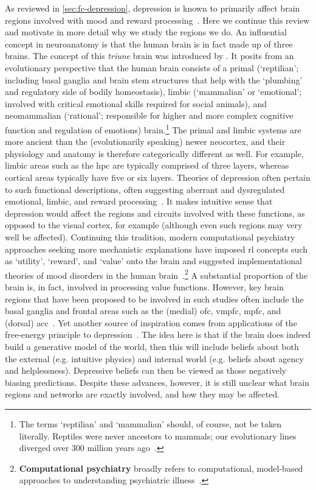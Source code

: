 As reviewed in \cref{sec:fc-depression}, depression is known to primarily affect brain regions involved with mood and reward processing~\parencite{Pandya2012}.
Here we continue this review and motivate in more detail why we study the regions we do.
%
An influential concept in neuroanatomy is that the human brain is in fact made up of three brains.
The concept of this \emph{triune} brain was introduced by \textcite{Maclean1985}.
It posits from an evolutionary perspective that the human brain consists of a primal (`reptilian'; including basal ganglia and brain stem structures that help with the `plumbing' and regulatory side of bodily homeostasis), limbic (`mammalian' or `emotional'; involved with critical emotional skills required for social animals), and neomammalian (`rational'; responsible for higher and more complex cognitive function and regulation of emotions) brain.\footnote{The terms `reptilian' and `mammalian' should, of course, not be taken literally. Reptiles were never ancestors to mammals; our evolutionary lines diverged over 300 million years ago~\parencite{Striedter2019}.}
The primal and limbic systems are more ancient than the (evolutionarily speaking) newer neocortex, and their physiology and anatomy is therefore categorically different as well.
For example, limbic areas such as the \gls{hpc} are typically comprised of three layers, whereas cortical areas typically have five or six layers.
Theories of depression often pertain to such functional descriptions, often suggesting aberrant and dysregulated emotional, limbic, and reward processing~\parencite{Akiskal1973}.
It makes intuitive sense that depression would affect the regions and circuits involved with these functions, as opposed to the visual cortex, for example (although even such regions may very well be affected).
Continuing this tradition, modern computational psychiatry approaches seeking more mechanistic explanations have imposed \gls{rl} concepts such as `utility', `reward', and `value' onto the brain and suggested implementational theories of mood disorders in the human brain~\parencite{Huys2013, Chen2015, Eldar2016, Juechems2019, Bennett2020, Bennett2021}.\footnote{\textbf{Computational psychiatry} broadly refers to computational, model-based approaches to understanding psychiatric illness~\parencite{Montague2012, Adams2016, Radulescu2019, Huys2021}.}
A substantial proportion of the brain is, in fact, involved in processing value functions.
However, key brain regions that have been proposed to be involved in such studies often include the basal ganglia and frontal areas such as the (medial) \gls{ofc}, \gls{vmpfc}, \gls{mpfc}, and (dorsal) \gls{acc}~\parencite{Lee2012}.
%
Yet another source of inspiration comes from applications of the free-energy principle to depression~\parencite{Chekroud2015}.
The idea here is that if the brain does indeed build a generative model of the world, then this will include beliefs about both the external (e.g. intuitive physics) and internal world (e.g. beliefs about agency and helplessness).
Depressive beliefs can then be viewed as those negatively biasing predictions.
Despite these advances, however, it is still unclear what brain regions and networks are exactly involved, and how they may be affected.

